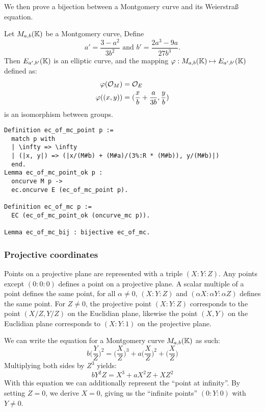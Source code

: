 We then prove a bijection between a Montgomery curve and its Weierstra{\ss} equation.

\begin{lemma}
  Let $M_{a,b}(\mathbb{K})$ be a Montgomery curve, Define $$a' = \frac{3-a^2}{3b^2} \text{\ \ \ \ and\ \ \ \ } b' = \frac{2a^3 - 9a}{27b^3}.$$
  Then $E_{a',b'}(\mathbb{K})$ is an elliptic curve, and the mapping $\varphi : M_{a,b}(\mathbb{K}) \mapsto E_{a',b'}(\mathbb{K})$ defined as:
  \begin{align*}
    \varphi(\mathcal{O}_M) &= \mathcal{O}_E\\
    \varphi( (x , y) ) &= ( \frac{x}{b} + \frac{a}{3b} , \frac{y}{b} )
  \end{align*}
  is an isomorphism between groups.
\end{lemma}

\begin{lstlisting}[language=Coq]
Definition ec_of_mc_point p :=
  match p with
  | \infty => \infty
  | (|x, y|) => (|x/(M#b) + (M#a)/(3%:R * (M#b)), y/(M#b)|)
  end.
Lemma ec_of_mc_point_ok p :
  oncurve M p ->
  ec.oncurve E (ec_of_mc_point p).

Definition ec_of_mc p :=
  EC (ec_of_mc_point_ok (oncurve_mc p)).

Lemma ec_of_mc_bij : bijective ec_of_mc.
\end{lstlisting}


\subsubsection{Projective coordinates}
\label{projective}
Points on a projective plane are represented with a triple $(X:Y:Z)$. Any points except $(0:0:0)$ defines a point on a projective plane. A scalar multiple of a point defines the same point, \ie
for all $\alpha \neq 0$, $(X:Y:Z)$ and $(\alpha X:\alpha Y:\alpha Z)$ defines the same point. For $Z\neq 0$, the projective point $(X:Y:Z)$ corresponds to the point $(X/Z,Y/Z)$ on the Euclidian plane, likewise the point $(X,Y)$ on the Euclidian plane corresponds to $(X:Y:1)$ on the projective plane.

We can write the equation for a Montgomery curve $M_{a,b}(\mathbb{K})$ as such:
\begin{equation}
b \bigg(\frac{Y}{Z}\bigg)^2 = \bigg(\frac{X}{Z}\bigg)^3 + a \bigg(\frac{X}{Z}\bigg)^2 + \bigg(\frac{X}{Z}\bigg)
\end{equation}
Multiplying both sides by $Z^3$ yields:
\begin{equation}
b Y^2Z = X^3 + a X^2Z + XZ^2
\end{equation}
With this equation we can additionally represent the ``point at infinity''. By setting $Z=0$, we derive $X=0$, giving us the ``infinite points'' $(0:Y:0)$ with $Y\neq 0$.

